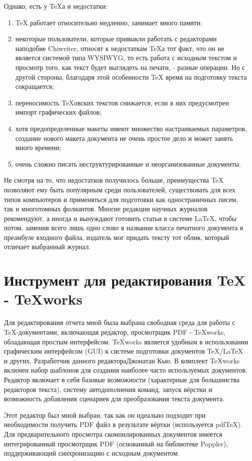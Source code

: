 \documentclass[a4paper,14pt]{report} %
\begin{document}
\noindent Однако, есть у TeXа и недостатки:
\begin{enumerate} %
\item TeX работает относительно медленно, занимает много памяти;
\item некоторые пользователи, которые привыкли работать с редакторами наподобие Chiwriter, относят к недостаткам TeXа тот факт, что он не является системой типа WYSIWYG, то есть работа с исходным текстом и просмотр того, как текст будет выглядеть на печати, - разные операции. Но с другой стороны, благодаря этой особенности TeX время на подготовку текста сокращается;
\item переносимость TeXовских текстов снижается, если в них предусмотрен импорт графических файлов;
\item хотя предопределенные макеты имеют множество настраиваемых параметров, создание нового макета документа не очень простое дело и может занять много времени;
\item очень сложно писать неструктурированные и неорганизованные документы.
\end{enumerate}

Не смотря на то, что недостатков получилось больше, преимущества TeX позволяют ему быть популярным среди пользователей, существовать для всех типов компьютеров и применяться для подготовки как одностраничных писем, так и многотомных фолиантов. Многие редакции научных журналов рекомендуют, а иногда и вынуждают готовить статьи в системе LaTeX, чтобы потом, заменив всего лишь одно слово в названии класса печатного документа в преамбуле входного файла, издатель мог придать тексту тот облик, который отличает выбранный журнал.
\section{Инструмент для редактирования TeX - TeXworks}
Для редактирования отчета мной была выбрана свободная среда для работы с TeX-документами, включающая редактор, просмотрщик PDF - TeXworks, обладающая простым интерфейсом. TeXworks является удобным в использовании графическим интерфейсом (GUI) к системе подготовки документов TeX/LaTeX и других. Разработчик данного редактораДжонатан Кью. В комплект TeXworks включен набор шаблонов для создания наиболее часто используемых документов. Редактор включает в себя базовые возможности (характерные для большинства редакторов текста), систему автодополнения команд, запуск вёрстки и возможность добавления сценариев для преобразования текста документа. 
\par
Этот редактор был мной выбран, так как он идеально подходит при необходимости получить PDF файл в результате вёртки (используется pdfTeX). Для предварительного просмотра скомпилированных документов имеется интегрированный просмотрщик PDF (основанный на библиотеке Poppler), поддерживающий синхронизацию с исходным документом.
\end{document}
